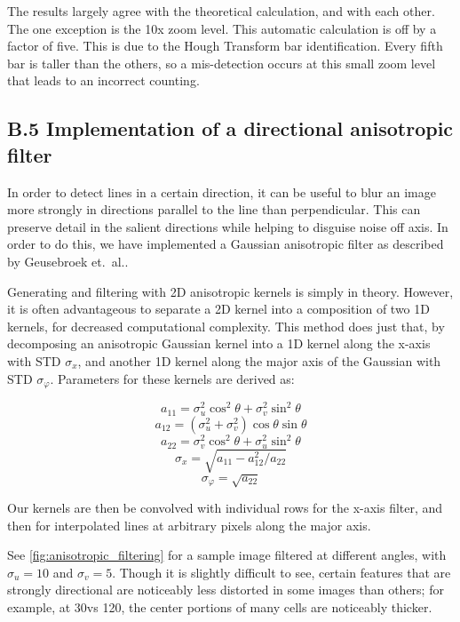 \documentclass{article}
\begin{document}
The results largely agree with the theoretical calculation, and with each other. The one exception is the 10x zoom level. This automatic calculation is off by a factor of five. This is due to the Hough Transform bar identification. Every fifth bar is taller than the others, so a mis-detection occurs at this small zoom level that leads to an incorrect counting.


\subsection*{B.5 Implementation of a directional anisotropic filter}

In order to detect lines in a certain direction, it can be useful to blur an image more strongly in directions parallel to the line than perpendicular. This can preserve detail in the salient directions while helping to disguise noise off axis. In order to do this, we have implemented a Gaussian anisotropic filter as described by Geusebroek et.\ al.\cite{geusebroek}.

Generating and filtering with 2D anisotropic kernels is simply in theory. However, it is often advantageous to separate a 2D kernel into a composition of two 1D kernels, for decreased computational complexity. This method does just that, by decomposing an anisotropic Gaussian kernel into a 1D kernel along the x-axis with STD $\sigma_x$, and another 1D kernel along the major axis of the Gaussian with STD $\sigma_\varphi$. Parameters for these kernels are derived as:

\[ a_{11} = \sigma_u^2 \cos^2 \theta + \sigma_v^2 \sin^2 \theta \]
\[ a_{12} = (\sigma_u^2 + \sigma_v^2)\cos\theta \sin\theta \]
\[ a_{22} = \sigma_v^2 \cos^2 \theta + \sigma_u^2 \sin^2 \theta \]
\[ \sigma_x = \sqrt{a_{11} - a_{12}^2/a_{22}} \]
\[ \sigma_\varphi = \sqrt{a_{22}} \]

Our kernels are then be convolved with individual rows for the x-axis filter, and then for interpolated lines at arbitrary pixels along the major axis.

See \ref{fig:anisotropic_filtering} for a sample image filtered at different angles, with $\sigma_u = 10$ and $\sigma_v = 5$. Though it is slightly difficult to see, certain features that are strongly directional are noticeably less distorted in some images than others; for example, at 30\degree vs 120\degree, the center portions of many cells are noticeably thicker.
\end{document}
